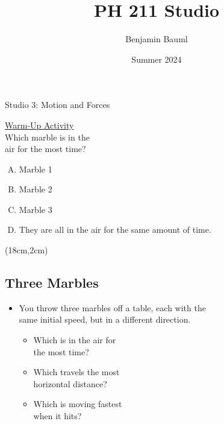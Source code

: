\documentclass[]{article}
\title{PH 211 Studio \Week}
\author{Benjamin Bauml}
\date{Summer 2024}
\begin{document}
\begin{TeacherMargin}

\end{TeacherMargin}
\begin{PresentSpace}
\begin{center}
	\huge Studio 3: Motion and Forces \\
	\vspace{1cm}
\end{center}
\underline{Warm-Up Activity} \\
Which marble is in the \\
air for the most time?
\begin{enumerate}[(A)]
	\item Marble 1
	\item Marble 2
	\item Marble 3
	\item They are all in the air for the same amount of time.
\end{enumerate}
\end{PresentSpace}
\begin{textblock*}{10cm}(18cm,2cm)
	\Large
\end{textblock*}
\newpage
\begin{TeacherMargin}

\end{TeacherMargin}
\begin{PresentSpace}
\vspace{-10pt}
\section*{Three Marbles}
\vspace{-10pt}
\begin{itemize}
	\item You throw three marbles off a table, each with the \\
	same initial speed, but in a different direction.
	\begin{itemize}
		\item Which is in the air for \\
		the most time?
		\item Which travels the most \\
		horizontal distance?
		\item Which is moving fastest \\
		when it hits?
	\end{itemize}
\end{itemize}
\end{PresentSpace}
\end{document}
